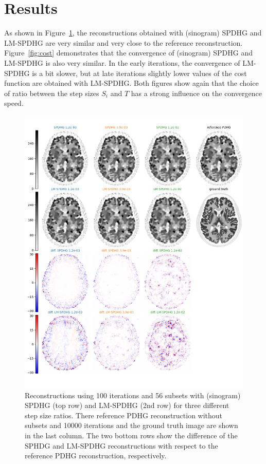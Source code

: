 \documentclass[10pt,twocolumn,twoside,letterpaper]{IEEEtran}
\begin{document}

\section{Results}

As shown in Figure~\ref{fig:recons}, the reconstructions obtained with (sinogram) SPDHG and LM-SPDHG
are very similar and very close to the reference reconstruction.
Figure~\ref{fig:cost} demonstrates that the convergence of (sinogram) SPDHG and
LM-SPDHG is also very similar. In the early iterations, the convergence of LM-SPDHG is a bit slower, but
at late iterations slightly lower values of the cost function are obtained with LM-SPDHG.
Both figures show again that the choice of ratio between the step sizes $S_i$ and $T$ has
a strong influence on the convergence speed.

\begin{figure}[t]
\centerline{\includegraphics[width=1.0\columnwidth]{./figs/brain2d_counts_1.0E+06_beta_2.0E-03_niter_10000_100_nsub_56_precond_False.png}}
\caption{Reconstructions using 100 iterations and 56 subsets with (sinogram) SPDHG (top row) and 
LM-SPDHG (2nd row) for three different step size ratios. 
There reference PDHG reconstruction without subsets and 10000 iterations and
the ground truth image are shown in the last column. 
The two bottom rows show the difference of the SPHDG and LM-SPDHG reconstructions with respect
to the reference PDHG reconstruction, respectively.}
\label{fig:recons}
\end{figure}
\end{document}
